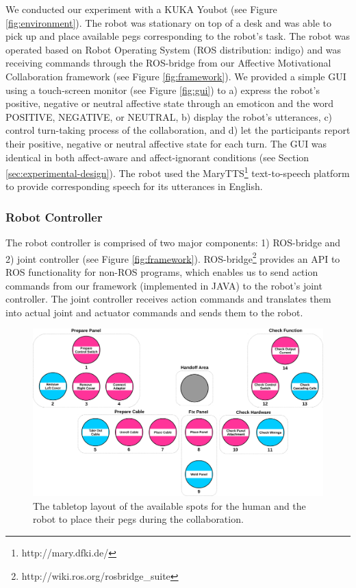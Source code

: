 \documentclass[12pt]{report}
\begin{document}
We conducted our experiment with a KUKA Youbot (see Figure
\ref{fig:environment}). The robot was stationary on top of a desk and was able
to pick up and place available pegs corresponding to the robot's task. The robot
was operated based on Robot Operating System (ROS distribution: indigo) and was
receiving commands through the ROS-bridge from our Affective Motivational
Collaboration framework (see Figure \ref{fig:framework}). We provided a simple
GUI using a touch-screen monitor (see Figure \ref{fig:gui}) to a) express the
robot's positive, negative or neutral affective state through an emoticon and
the word POSITIVE, NEGATIVE, or NEUTRAL, b) display the robot's utterances, c)
control turn-taking process of the collaboration, and d) let the participants
report their positive, negative or neutral affective state for each turn. The
GUI was identical in both affect-aware and affect-ignorant conditions (see
Section \ref{sec:experimental-design}). The robot used the
MaryTTS\footnote{http://mary.dfki.de/} text-to-speech platform to provide
corresponding speech for its utterances in English.

\subsubsection{Robot Controller}
The robot controller is comprised of two major components: 1) ROS-bridge and 2)
joint controller (see Figure \ref{fig:framework}).
ROS-bridge\footnote{http://wiki.ros.org/rosbridge\_suite} provides an API to ROS
functionality for non-ROS programs, which enables us to send action commands
from our framework (implemented in JAVA) to the robot's joint controller. The
joint controller receives action commands and translates them into actual joint
and actuator commands and sends them to the robot.

\begin{figure}[t]
  \centering
  \includegraphics[width=1\textwidth]{figure/gameBoard.pdf}
  \caption{The tabletop layout of the available spots for the human and the
  robot to place their pegs during the collaboration.}
  \label{fig:game_board}
\end{figure}
\end{document}
